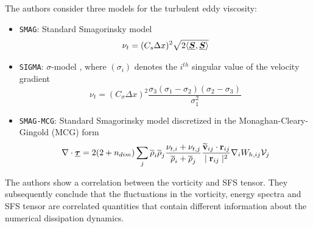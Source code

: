 The authors consider three models for the turbulent eddy viscosity:
\begin{itemize}
    \item \texttt{SMAG}: Standard Smagorinsky model
        \begin{equation}
            \nu_t = (C_s \Delta x)^2 \sqrt{2 \langle \underline{\bm{S}}, \underline{\bm{S}} \rangle}
            \label{eq:Okraschevski2022-SMAG}
        \end{equation}
        
    \item \texttt{SIGMA}: $\sigma$-model \parencite{nicoud2011using}, where $(\sigma_i)$ denotes the $i^{th}$ singular value of the velocity gradient
        \begin{equation}
            \nu_t = (C_{\sigma} \Delta x)^2 \frac{\sigma_3 (\sigma_1 - \sigma_2) (\sigma_2 - \sigma_3)}{\sigma_1^2}
            \label{eq:Okraschevski2022-SIGMA}
        \end{equation}
    
    \item \texttt{SMAG-MCG}: Standard Smagorinsky model discretized in the Monaghan-Cleary-Gingold (MCG) form \parencite{cleary1999conduction}
        \begin{equation}
            \nabla \cdot \underline{\bm{\tau}} = 2(2+n_{dim}) \sum_j \overline{\rho}_i \overline{\rho}_j \frac{\nu_{t, i} + \nu_{t, j}}{\overline{\rho}_i + \overline{\rho}_j} \frac{\widetilde{\mathbf{v}}_{ij} \cdot \mathbf{r}_{ij} }{\mid \mathbf{r}_{ij} \mid^{2}} \nabla_{i} W_{h, ij} \mathcal{V}_j
            \label{eq:Okraschevski2022-SMAG-MCG}
        \end{equation}
\end{itemize}

The authors show a correlation between the vorticity and SFS tensor. They subsequently conclude that the fluctuations in the vorticity, energy spectra and SFS tensor are correlated quantities that contain different information about the numerical dissipation dynamics.

